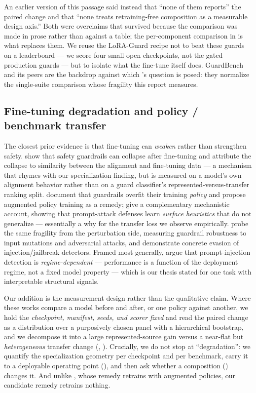 \noindent An earlier version of this passage said instead that ``none of them reports'' the paired
change and that ``none treats retraining-free composition as a measurable design axis.'' Both were
overclaims that survived because the comparison was made in prose rather than against a table; the
per-component comparison in  is what replaces them. We reuse the LoRA-Guard recipe not to beat
these guards on a leaderboard --- we score four small open checkpoints, not the gated production guards
--- but to isolate what the fine-tune itself does. GuardBench and its peers are the backdrop against
which 's question is posed: they normalize the single-suite comparison whose fragility
this report measures.

\subsection{Fine-tuning degradation and policy / benchmark transfer}
\label{sec:related-transfer}
The closest prior evidence is that fine-tuning can \emph{weaken} rather than strengthen safety.
\citet{hsiung2025guardrails} show that safety guardrails can collapse after fine-tuning and attribute
the collapse to similarity between the alignment and fine-tuning data --- a mechanism that rhymes with
our specialization finding, but is measured on a model's own alignment behavior rather than on a guard
classifier's represented-versus-transfer ranking split. \citet{liu2026domaingeneralizable} document that
guardrails overfit their training \emph{policy} and propose augmented policy training as a remedy;
\citet{li2026surfaceheuristics} give a complementary mechanistic account, showing that prompt-attack
defenses learn \emph{surface heuristics} that do not generalize --- essentially a why for the transfer
loss we observe empirically. \citet{bassani2025robustness} probe the same fragility from the
perturbation side, measuring guardrail robustness to input mutations and adversarial attacks, and
\citet{hackett2025bypassing} demonstrate concrete evasion of injection/jailbreak detectors. Framed most
generally, \citet{akinrele2026regime} argue that prompt-injection detection is \emph{regime-dependent} ---
performance is a function of the deployment regime, not a fixed model property --- which is our thesis
stated for one task with interpretable structural signals.

Our addition is the measurement design rather than the qualitative claim. Where these works compare a
model before and after, or one policy against another, we hold the \emph{checkpoint, manifest, seeds,
and scorer fixed} and read the paired change as a distribution over a purposively chosen panel with a
hierarchical bootstrap, and we decompose it into a large represented-source gain versus a near-flat but
\emph{heterogeneous} transfer change (, ). Crucially, we do not stop
at ``degradation'': we quantify the specialization geometry per checkpoint and per benchmark, carry it
to a deployable operating point (), and then ask whether a composition
() changes it. And unlike \citet{liu2026domaingeneralizable}, whose remedy retrains with
augmented policies, our candidate remedy retrains nothing.

